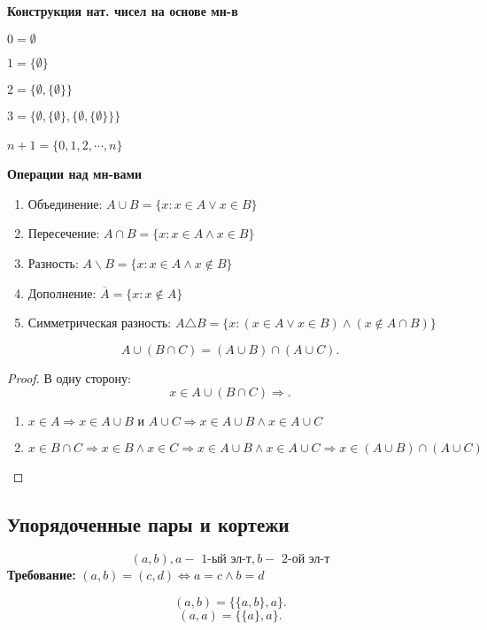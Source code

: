 \textbf{Конструкция нат. чисел на основе мн-в} 

$0 = \emptyset$

$1 = \{\emptyset\}$

$2 = \{\emptyset, \{\emptyset\}\}$

$3 = \{\emptyset, \{\emptyset\}, \{\emptyset, \{\emptyset\}\}\}$

$n + 1 = \{0, 1, 2, \cdots, n\}$
~\newline

\textbf{Операции над мн-вами}
\begin{enumerate}
    \item Объединение: $A \cup B = \{ x \colon x \in A \lor x \in B\}$
    \item Пересечение: $A \cap B = \{x \colon x \in A \land x \in B\}$ 
    \item Разность: $A \backslash B = \{x \colon x \in A \land x \not\in B\}$
    \item Дополнение: $\overline{A} = \{x \colon x \not\in A\}$
    \item Симметрическая разность: $A \triangle B = \{x \colon (x \in A \lor x \in B) \land (x \not\in A \cap B)\}$
\end{enumerate}

\begin{statement}
\[
A \cup (B \cap C) = (A \cup B) \cap (A \cup C)
.\] 
\end{statement}
\begin{proof}
    В одну сторону:
\[
x \in A \cup(B \cap C) \Rightarrow 
.\] 
\begin{enumerate}
    \item $x \in A \Rightarrow x \in A \cup B \text{ и } A \cup C \Rightarrow x \in A \cup B \land x \in A \cup C$
    \item $x \in B \cap C \Rightarrow x \in B \land x \in C \Rightarrow x \in A \cup B \land  x \in A \cup C \Rightarrow x \in (A \cup B) \cap (A \cup C)$
\end{enumerate}
\end{proof}

\subsection{Упорядоченные пары и кортежи}
\[
    (a, b), a - \text{ 1-ый эл-т}, b - \text{ 2-ой эл-т}
\]
\textbf{Требование: } $(a, b) = (c, d) \iff a = c \land b = d$

\begin{definition}
    \[
        (a, b) = \{\{a, b\}, a\}
.\] 
        \[
            (a, a) = \{\{a\}, a\}
        .\] 


\end{definition}
